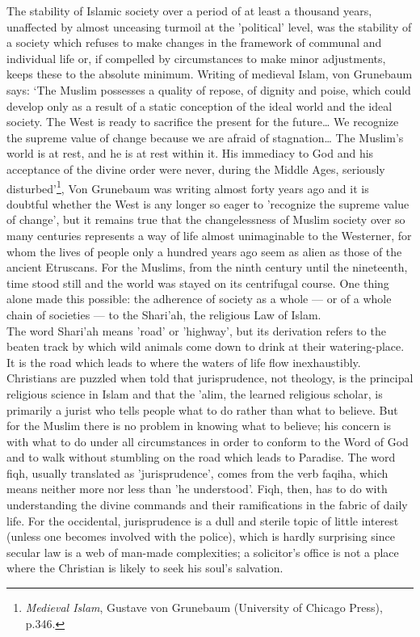\documentclass[10pt, twoside]{book}
\begin{document}
The stability of Islamic society over a period of at least a thousand years, unaffected by almost 
unceasing turmoil at the 'political' level, was the stability of a society which refuses to make 
changes in the framework of communal and individual life or, if compelled by circumstances to make 
minor adjustments, keeps these to the absolute minimum. Writing of medieval Islam, von Grunebaum 
says: `The Muslim possesses a quality of repose, of dignity and poise, which could develop only as a 
result of a static conception of the ideal world and the ideal society. The West is ready to 
sacrifice the present for the future\ldots{} We recognize the supreme value of change because we are 
afraid of stagnation\ldots{} The Muslim's world is at rest, and he is at rest within it. His immediacy to 
God and his acceptance of the divine order were never, during the Middle Ages, seriously 
disturbed'\footnote{\emph{Medieval Islam}, Gustave von Grunebaum (University of Chicago Press), p.346.}, Von Grunebaum was writing almost forty years ago and it is doubtful whether the West 
is any longer so eager to 'recognize the supreme value of change', but it remains true that the 
changelessness of Muslim society over so many centuries represents a way of life almost unimaginable 
to the Westerner, for whom the lives of people only a hundred years ago seem as alien as those of the 
ancient Etruscans. For the Muslims, from the ninth century until the nineteenth, time stood still and 
the world was stayed on its centrifugal course. One thing alone made this possible: the adherence of 
society as a whole --- or of a whole chain of societies --- to the Shari'ah, the religious Law of Islam. \\

The word Shari'ah means 'road' or 'highway', but its derivation refers to the beaten track by which 
wild animals come down to drink at their watering\hyp{}place. It is the road which leads to where the 
waters of life flow inexhaustibly. \\

Christians are puzzled when told that jurisprudence, not theology, is the principal religious science 
in Islam and that the 'alim, the learned religious scholar, is primarily a jurist who tells people 
what to do rather than what to believe. But for the Muslim there is no problem in knowing what to 
believe; his concern is with what to do under all circumstances in order to conform to the Word of 
God and to walk without stumbling on the road which leads to Paradise. The word fiqh, usually 
translated as 'jurisprudence', comes from the verb faqiha, which means neither more nor less than 'he 
understood'. Fiqh, then, has to do with understanding the divine commands and their ramifications in 
the fabric of daily life. For the occidental, jurisprudence is a dull and sterile topic of little 
interest (unless one becomes involved with the police), which is hardly surprising since secular law 
is a web of man\hyp{}made complexities; a solicitor's office is not a place where the Christian is likely 
to seek his soul's salvation. \\
\end{document}
